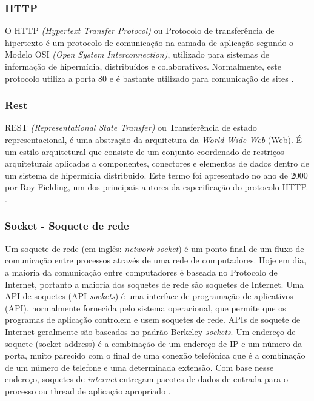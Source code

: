 \documentclass[journal]{IEEEtran}
\begin{document}
\subsubsection{HTTP}
O HTTP \emph{(Hypertext Transfer Protocol)} ou Protocolo de transferência de hipertexto é um protocolo de comunicação na camada de aplicação segundo o Modelo OSI \emph{(Open System Interconnection)}, utilizado para sistemas de informação de hipermídia, distribuídos e colaborativos. Normalmente, este protocolo utiliza a porta 80 e é bastante utilizado para comunicação de sites \cite{oficinahttp}.


\subsubsection{Rest}

REST \emph{(Representational State Transfer)} ou Transferência de estado representacional, é uma abstração da arquitetura da \emph{World Wide Web} (Web). É um estilo arquitetural que consiste de um conjunto coordenado de restriços arquiteturais aplicadas a componentes, conectores e elementos de dados dentro de um sistema de hipermídia distribuido. Este termo foi apresentado no ano de 2000 por Roy Fielding, um dos principais autores da especificação do protocolo HTTP. \cite{fieldingrest}.

\subsubsection{Socket - Soquete de rede}

Um soquete de rede (em inglês: \emph{network socket}) é um ponto final de um fluxo de comunicação entre processos através de uma rede de computadores. Hoje em dia, a maioria da comunicação entre computadores é baseada no Protocolo de Internet, portanto a maioria dos soquetes de rede são soquetes de Internet. Uma API de soquetes (API \emph{sockets}) é uma interface de programação de aplicativos (API), normalmente fornecida pelo sistema operacional, que permite que os programas de aplicação controlem e usem soquetes de rede. APIs de soquete de Internet geralmente são baseados no padrão Berkeley \emph{sockets}. Um endereço de soquete (socket address) é a combinação de um endereço de IP e um número da porta, muito parecido com o final de uma conexão telefônica que é a combinação de um número de telefone e uma determinada extensão. Com base nesse endereço, soquetes de \emph{internet} entregam pacotes de dados de entrada para o processo ou thread de aplicação apropriado \cite{pedropintosocket}.
\end{document}
